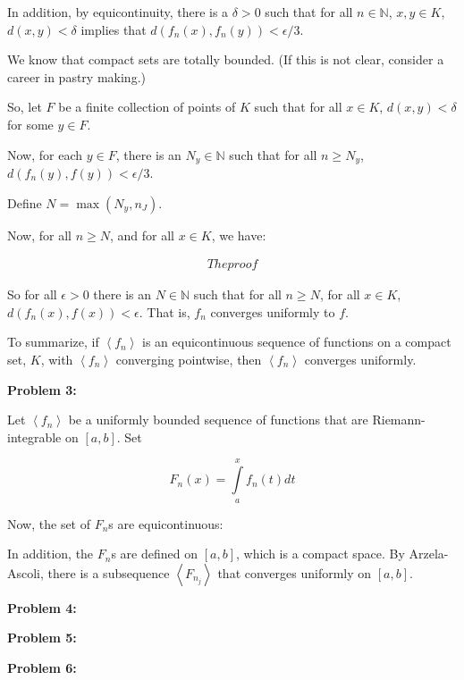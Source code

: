 \documentclass[a4paper,12pt]{article}
\newcommand{\tab}{\hspace{4mm}} %
\newcommand{\shunt}{\vspace{20mm}}
\newcommand{\anbrack}[1]{\left\langle #1 \right\rangle}
\newcommand{\de}{\delta}
\newcommand{\ep}{\epsilon}
\newcommand{\N}{\mathbb{N}}
\begin{document}
\tab In addition, by equicontinuity, there is a $\de >0$ such that for all $n \in \N$, $x,y \in K$, $d(x,y) < \de$ implies that $d(f_n(x),f_n(y)) < \ep/3$.

\tab We know that compact sets are totally bounded. (If this is not clear, consider a career in pastry making.)

\tab So, let $F$ be a finite collection of points of $K$ such that for all $x \in K$, $d(x,y) < \de$ for some $y \in F$.

\tab Now, for each $y \in F$, there is an $N_y \in \N$ such that for all $n \geq N_y$, $d(f_n(y),f(y)) < \ep/3$. 

\tab Define $N = \max(N_y,n_J)$. 

\tab Now, for all $n \geq N$, and for all $x \in K$, we have:

\begin{align*}
The proof
\end{align*}

So for all $\ep >0$ there is an $N \in \N$ such that for all $n \geq N$, for all $x \in K$, $d(f_n(x),f(x)) < \ep$. That is, $f_n$ converges uniformly to $f$.

To summarize, if $\anbrack{f_n}$ is an equicontinuous sequence of functions on a compact set, $K$, with $\anbrack{f_n}$ converging pointwise, then $\anbrack{f_n}$ converges uniformly.

\shunt

{\bf Problem 3:}

Let $\anbrack{f_n}$ be a uniformly bounded sequence of functions that are Riemann-integrable on $[a,b]$. Set

\begin{displaymath}
F_n(x) = \int\limits_a^x f_n(t)dt
\end{displaymath}

Now, the set of $F_n$s are equicontinuous: %

In addition, the $F_n$s are defined on $[a,b]$, which is a compact space. By Arzela-Ascoli, there is a subsequence $\anbrack{F_{n_j}}$ that converges uniformly on $[a,b]$.
\shunt

{\bf Problem 4:}

\shunt

{\bf Problem 5:}

\shunt

{\bf Problem 6:}

\shunt
\end{document}
